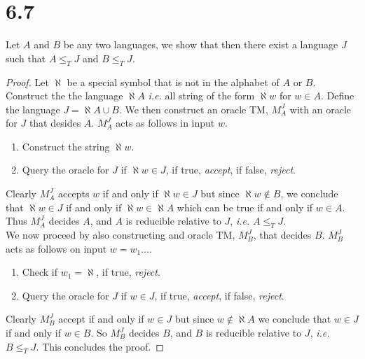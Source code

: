 \documentclass[a4paper,11pt]{article}
\newcommand{\ie}{\emph{i.e.} }
\numberwithin{equation}{section}
\begin{document}
\section*{6.7}
Let $ A $ and $ B $ be any two languages, we show that then there exist a language $ J $ such that $ A\leq_T J $ and $ B\leq_T J $.
\begin{proof}
	Let $ \aleph $ be a special symbol that is not in the alphabet of $ A $ or $ B $. Construct the the language $ \aleph A $ \ie all string of the form $ \aleph w $ for $ w\in A $. Define the language $ J=\aleph A\cup B $. We then construct an oracle TM, $ M^J_A $ with an oracle for $ J $ that desides $ A $. $ M_A^J $ acts as follows in input $ w $. \begin{enumerate}
		\item Construct the string $ \aleph w $.
		\item Query the oracle for $ J $ if $ \aleph w\in J $, if true, \emph{accept}, if false, \emph{reject}.
	\end{enumerate}
	Clearly $ M_A^J $ accepts $ w $ if and only if $ \aleph w\in J $ but since $ \aleph w\notin B $, we conclude that $ \aleph w\in J $ if and only if $ \aleph w\in \aleph A $ which can be true if and only if $ w\in A $. Thus $ M_A^J $ decides $ A $, and $ A $ is reducible relative to $ J $, \ie $ A\leq_T J $.\\
	We now proceed by also constructing and oracle TM, $ M_B^J $, that decides $ B $. $ M_B^J $ acts as follows on input $ w=w_1... $. \begin{enumerate}
	    \item Check if $w_1=\aleph$, if true, \emph{reject}.
		\item Query the oracle for $ J $ if $ w\in J $, if true, \emph{accept}, if false, \emph{reject}.
	\end{enumerate}
	Clearly $ M_B^J $ accept if and only if $ w\in J $ but since $ w\notin \aleph A $ we conclude that $ w\in J $ if and only if $ w\in B $. So $ M_B^J $ decides $ B $, and $ B $ is reducible relative to $ J $, \ie $ B\leq_T J $. This concludes the proof.
\end{proof}
\end{document}
